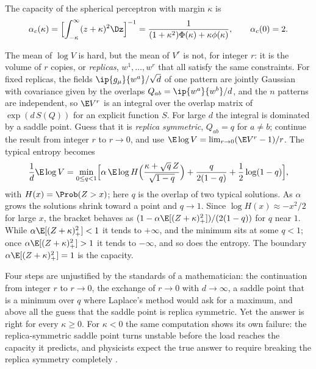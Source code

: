 \begin{refsection}
\begin{physicsbox}[Gardner 1988]
The capacity of the spherical perceptron with margin $\kappa$ is
\[
\alpha_c(\kappa)=\Bigl[\int_{-\kappa}^{\infty}(z+\kappa)^2\Dz\Bigr]^{-1}=\frac1{(1+\kappa^2)\Phi(\kappa)+\kappa\phi(\kappa)},
\qquad\alpha_c(0)=2 .
\]
\end{physicsbox}

\begin{heuristic}
The mean of $\log V$ is hard, but the mean of $V^r$ is not, for integer $r$: it is the volume of $r$ copies, or \emph{replicas}, $w^1,\dots,w^r$ that all satisfy the same constraints. For fixed replicas, the fields $\ip{g_\mu}{w^a}/\sqrt d$ of one pattern are jointly Gaussian with covariance given by the overlaps $Q_{ab}=\ip{w^a}{w^b}/d$, and the $n$ patterns are independent, so $\E V^r$ is an integral over the overlap matrix of $\exp(d\,S(Q))$ for an explicit function $S$. For large $d$ the integral is dominated by a saddle point. Guess that it is \emph{replica symmetric}, $Q_{ab}=q$ for $a\ne b$; continue the result from integer $r$ to $r\to0$, and use $\E\log V=\lim_{r\to0}(\E V^r-1)/r$. The typical entropy becomes
\[
\frac1d\E\log V=\min_{0\le q<1}\Bigl[\alpha\,\E\log H\Bigl(\frac{\kappa+\sqrt q\,Z}{\sqrt{1-q}}\Bigr)+\frac q{2(1-q)}+\frac12\log(1-q)\Bigr],
\]
with $H(x)=\Prob(Z>x)$; here $q$ is the overlap of two typical solutions. As $\alpha$ grows the solutions shrink toward a point and $q\to1$. Since $\log H(x)\approx-x^2/2$ for large $x$, the bracket behaves as $(1-\alpha\E[(Z+\kappa)_+^2])/(2(1-q))$ for $q$ near $1$. While $\alpha\E[(Z+\kappa)_+^2]<1$ it tends to $+\infty$, and the minimum sits at some $q<1$; once $\alpha\E[(Z+\kappa)_+^2]>1$ it tends to $-\infty$, and so does the entropy. The boundary $\alpha\E[(Z+\kappa)_+^2]=1$ is the capacity.
\end{heuristic}

Four steps are unjustified by the standards of a mathematician: the continuation from integer $r$ to $r\to0$, the exchange of $r\to0$ with $d\to\infty$, a saddle point that is a minimum over $q$ where Laplace's method would ask for a maximum, and above all the guess that the saddle point is replica symmetric. Yet the answer is right for every $\kappa\ge0$. For $\kappa<0$ the same computation shows its own failure: the replica-symmetric saddle point turns unstable before the load reaches the capacity it predicts, and physicists expect the true answer to require breaking the replica symmetry completely \parencite{FranzParisi2016,FranzEtAl2017}.


\end{refsection}
